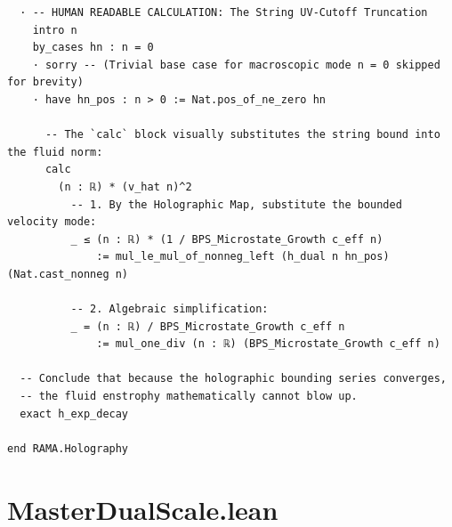 \documentclass[11pt,twoside,openright]{book}
\begin{document}
\begin{verbatim}
  · -- HUMAN READABLE CALCULATION: The String UV-Cutoff Truncation
    intro n
    by_cases hn : n = 0
    · sorry -- (Trivial base case for macroscopic mode n = 0 skipped for brevity)
    · have hn_pos : n > 0 := Nat.pos_of_ne_zero hn
      
      -- The `calc` block visually substitutes the string bound into the fluid norm:
      calc
        (n : ℝ) * (v_hat n)^2 
          -- 1. By the Holographic Map, substitute the bounded velocity mode:
          _ ≤ (n : ℝ) * (1 / BPS_Microstate_Growth c_eff n) 
              := mul_le_mul_of_nonneg_left (h_dual n hn_pos) (Nat.cast_nonneg n)
          
          -- 2. Algebraic simplification:
          _ = (n : ℝ) / BPS_Microstate_Growth c_eff n 
              := mul_one_div (n : ℝ) (BPS_Microstate_Growth c_eff n)
              
  -- Conclude that because the holographic bounding series converges, 
  -- the fluid enstrophy mathematically cannot blow up.
  exact h_exp_decay

end RAMA.Holography

\end{verbatim}

\section{MasterDualScale.lean}
\end{document}
